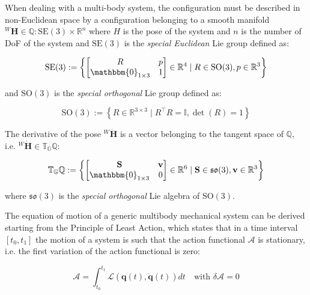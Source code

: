 When dealing with a multi-body system, the configuration must be described in non-Euclidean space by a configuration belonging to a smooth manifold ${}^W\mathbf{H} \in \mathbb{Q}:\mathrm{SE}(3)\times\mathbb{R}^n$ where $H$ is the pose of the system and $n$ is the number of \ac{DoF} of the system and $\mathrm{SE}(3)$ is the \textit{special Euclidean} Lie group defined as:

\begin{equation}
    \mathrm{SE}(3) := \left\{
    \begin{bmatrix}
        R                         & p \\
        \mathbbm{0} _{1 \times 3} & 1
    \end{bmatrix} \in \mathbb{R} ^4 \mid R \in \mathrm{SO}(3), p \in \mathbb{R} ^3
    \right\}
\end{equation}

and $\mathrm{SO}(3)$ is the \textit{special orthogonal} Lie group defined as:

\begin{equation}
    \mathrm{SO}(3) := \left\{
    R \in \mathbb{R} ^{3 \times 3} \mid R ^\top R = \mathbb{I}, \det(R) = 1
    \right\}
\end{equation}

The derivative of the pose ${}^W\dot{\mathbf{H}}$ is a vector belonging to the tangent space of $\mathbb{Q}$, i.e. ${}^W\dot{\mathbf{H}} \in \mathbb{T} _{\mathbb{G}} \mathbb{Q}$:

\begin{equation}
    \mathbb{T} _{\mathbb{G}} \mathbb{Q} := \left\{
    \begin{bmatrix}
        \mathbf{S}                & \mathbf{v} \\
        \mathbbm{0} _{1 \times 3} & 0
    \end{bmatrix} \in \mathbb{R} ^6 \mid \mathbf{S} \in \mathfrak{so}(3), \mathbf{v} \in \mathbb{R} ^3
    \right\}
\end{equation}

where $\mathfrak{so}(3)$ is the \textit{special orthogonal} Lie algebra of $\mathrm{SO}(3)$.

The equation of motion of a generic multibody mechanical system can be derived starting from the Principle of Least Action, which states that in a time interval $[t _0, t _1]$ the motion of a system is such that the action functional $\mathcal{A}$ is stationary, i.e. the first variation of the action functional is zero:

\begin{equation}
    \mathcal{A} = \int _{t _0} ^{t _1} \mathcal{L} (\mathbf{q}(t), \mathbf{\dot{q}}(t)) dt \quad \text{with } \delta \mathcal{A} = 0
\end{equation}

